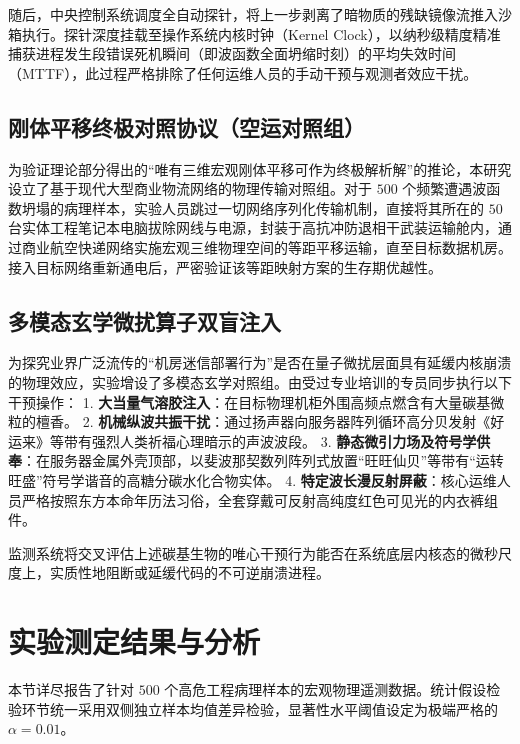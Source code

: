 \documentclass[journal]{IEEEtran}
\begin{document}
随后，中央控制系统调度全自动探针，将上一步剥离了暗物质的残缺镜像流推入沙箱执行。探针深度挂载至操作系统内核时钟（Kernel Clock），以纳秒级精度精准捕获进程发生段错误死机瞬间（即波函数全面坍缩时刻）的平均失效时间（MTTF），此过程严格排除了任何运维人员的手动干预与观测者效应干扰。

\subsection{刚体平移终极对照协议（空运对照组）}
为验证理论部分得出的“唯有三维宏观刚体平移可作为终极解析解”的推论，本研究设立了基于现代大型商业物流网络的物理传输对照组。对于 $500$ 个频繁遭遇波函数坍塌的病理样本，实验人员跳过一切网络序列化传输机制，直接将其所在的 $50$ 台实体工程笔记本电脑拔除网线与电源，封装于高抗冲防退相干武装运输舱内，通过商业航空快递网络实施宏观三维物理空间的等距平移运输，直至目标数据机房。接入目标网络重新通电后，严密验证该等距映射方案的生存期优越性。

\subsection{多模态玄学微扰算子双盲注入}
为探究业界广泛流传的“机房迷信部署行为”是否在量子微扰层面具有延缓内核崩溃的物理效应，实验增设了多模态玄学对照组。由受过专业培训的专员同步执行以下干预操作：
1. \textbf{大当量气溶胶注入}：在目标物理机柜外围高频点燃含有大量碳基微粒的檀香。
2. \textbf{机械纵波共振干扰}：通过扬声器向服务器阵列循环高分贝发射《好运来》等带有强烈人类祈福心理暗示的声波波段。
3. \textbf{静态微引力场及符号学供奉}：在服务器金属外壳顶部，以斐波那契数列阵列式放置“旺旺仙贝”等带有“运转旺盛”符号学谐音的高糖分碳水化合物实体。
4. \textbf{特定波长漫反射屏蔽}：核心运维人员严格按照东方本命年历法习俗，全套穿戴可反射高纯度红色可见光的内衣裤组件。

监测系统将交叉评估上述碳基生物的唯心干预行为能否在系统底层内核态的微秒尺度上，实质性地阻断或延缓代码的不可逆崩溃进程。


\section{实验测定结果与分析}

本节详尽报告了针对 $500$ 个高危工程病理样本的宏观物理遥测数据。统计假设检验环节统一采用双侧独立样本均值差异检验，显著性水平阈值设定为极端严格的 $\alpha = 0.01$。
\end{document}
